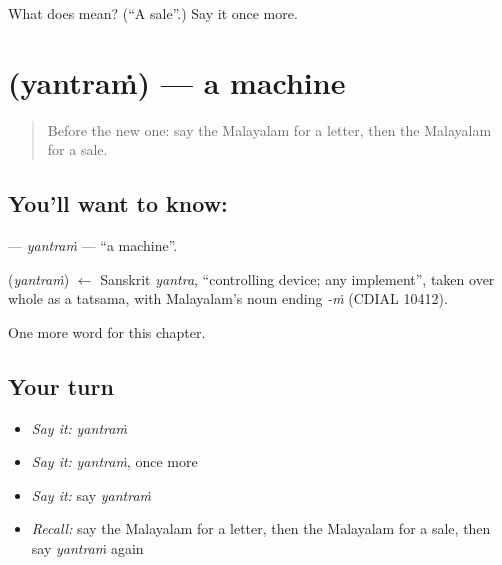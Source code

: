 \begin{tcolorbox}[breakable,colback=teal!4,colframe=teal!35!black,title={Before you move on}]
What does  mean? (\textquotedblleft{}A sale\textquotedblright{}.) Say it once more.
\end{tcolorbox}
\section[\texorpdfstring{\ml{യന്ത്രം} (yantraṁ)}{യന്ത്രം (yantraṁ)}]{ (yantraṁ) — a machine}

\label{lesson:ML-C336-yantram}



\begin{quote}
Before the new one: say the Malayalam for a letter, then the Malayalam for a sale.
\end{quote}

\subsection*{You'll want to know: }
\textbf{} — \emph{yantraṁ} — \textquotedblleft{}a machine\textquotedblright{}.

\begin{cousinweb}
\textbf{} (\emph{yantraṁ}) $\leftarrow$ Sanskrit \emph{yantra}, \textquotedblleft{}controlling device; any implement\textquotedblright{}, taken over whole as a tatsama, with Malayalam's noun ending \emph{-ṁ} (CDIAL 10412).
\end{cousinweb}

\begin{grammarlens}[title={What you've built}]
One more word for this chapter.
\end{grammarlens}

\subsection*{Your turn}
\begin{itemize}
\raggedright
  \item \emph{Say it:} \emph{yantraṁ}
  \item \emph{Say it:} \emph{yantraṁ}, once more
  \item \emph{Say it:} say \emph{yantraṁ}
  \item \emph{Recall:} say the Malayalam for a letter, then the Malayalam for a sale, then say \emph{yantraṁ} again
\end{itemize}

